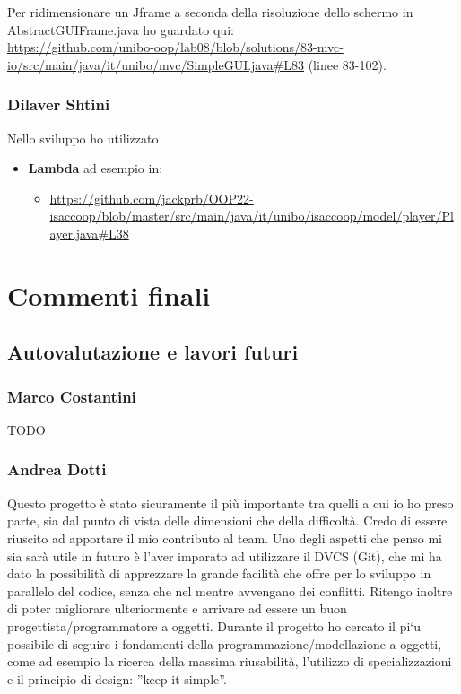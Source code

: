 \documentclass[a4paper,12pt]{report}
\begin{document}
Per ridimensionare un Jframe a seconda della risoluzione dello schermo in AbstractGUIFrame.java ho guardato qui: 
\\\url{https://github.com/unibo-oop/lab08/blob/solutions/83-mvc-io/src/main/java/it/unibo/mvc/SimpleGUI.java#L83} (linee 83-102).

\subsection*{Dilaver Shtini}
Nello sviluppo ho utilizzato
\begin{itemize}
\item \textbf{Lambda} ad esempio in:
    \begin{itemize}
        \item \url{https://github.com/jackprb/OOP22-isaccoop/blob/master/src/main/java/it/unibo/isaccoop/model/player/Player.java#L38}
    \end{itemize}
\end{itemize}


\chapter{Commenti finali}

\section{Autovalutazione e lavori futuri}
\subsection*{Marco Costantini}
{TODO}

\subsection*{Andrea Dotti}
Questo progetto è stato sicuramente il più importante tra quelli a cui io ho preso parte, sia dal punto di vista delle dimensioni che della difficoltà. Credo di essere riuscito ad apportare il mio contributo al team. Uno degli aspetti che penso mi sia sarà utile in futuro è l’aver imparato ad utilizzare il DVCS (Git), che mi ha dato la possibilità di apprezzare la grande facilità che offre per lo sviluppo in parallelo del codice, senza che nel mentre avvengano dei conflitti. Ritengo inoltre di poter migliorare ulteriormente e arrivare ad essere un buon progettista/programmatore a oggetti. Durante il progetto ho cercato il pi`u possibile di seguire i fondamenti della programmazione/modellazione a oggetti, come ad esempio la ricerca della massima riusabilità, l’utilizzo di specializzazioni e il principio di design: ”keep it simple”.
\end{document}
